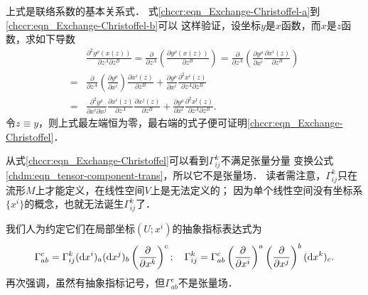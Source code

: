 上式是联络系数的基本关系式．
式\eqref{chccr:eqn_Exchange-Christoffel-a}到\eqref{chccr:eqn_Exchange-Christoffel-b}可以
这样验证，设坐标$y$是$x$函数，而$x$是$z$函数，求如下导数
\begin{equation} \label{chccr:eqn_tmp21}
\begin{aligned}
    &\frac{{{\partial ^2}{y^\rho }\left( {x\left( z \right)} \right)}}{{\partial {z^A}\partial {z^B}}}
     = \frac{\partial }{{\partial {z^A}}}\left( {\frac{{\partial {y^\rho }
                \left( {x\left( z \right)} \right)}}{{\partial {z^B}}}} \right)
             = \frac{\partial }{{\partial {z^A}}}\left( {\frac{{\partial {y^\rho }}}
                 {{\partial {x^i}}}\frac{{\partial {x^i}\left( z \right)}}{{\partial {z^B}}}} \right)\\
    =& \frac{\partial }{{\partial {z^A}}}\left( {\frac{{\partial {y^\rho }}}
        {{\partial {x^i}}}} \right)\frac{{\partial {x^i}\left( z \right)}}{{\partial {z^B}}}
    + \frac{{\partial {y^\rho }}}{{\partial {x^i}}}\frac{{{\partial ^2}{x^i}
            \left( z \right)}}{{\partial {z^A}\partial {z^B}}} \\
    =& \frac{{{\partial ^2}{y^\rho }}}{{\partial {x^i}\partial {x^j}}}
    \frac{{\partial {x^i}\left( z \right)}}{{\partial {z^A}}}
    \frac{{\partial {x^j}\left( z \right)}}{{\partial {z^B}}}
     + \frac{{\partial {y^\rho }}}{{\partial {x^l}}}\frac{{{\partial ^2}{x^l}
             \left( z \right)}}{{\partial {z^A}\partial {z^B}}} .
\end{aligned}\end{equation}
令$z\equiv y$，则上式最左端恒为零，最右端的式子便可证明\eqref{chccr:eqn_Exchange-Christoffel}．

从式\eqref{chccr:eqn_Exchange-Christoffel}可以看到$\Gamma^{k}_{ij}$不满足张量分量
变换公式\eqref{chdm:eqn_tensor-component-trans}，所以它不是张量场．
读者需注意，$\Gamma^{k}_{ij}$只在流形$M$上才能定义，在线性空间$V$上是无法定义的；
因为单个线性空间没有坐标系$\{x^i\}$的概念，也就无法诞生$\Gamma^{k}_{ij}$了．

我们人为约定它们在局部坐标$(U;x^i)$的抽象指标表达式为
\begin{equation}\label{chccr:eqn_Christoffel-naturalbases-ij}
    \Gamma_{ab}^c = \Gamma_{ij}^k ({\rm d}x^i)_a ({\rm d}x^j)_b
    \left(\frac{\partial}{\partial x^k} \right)^c; \quad
    \Gamma_{ij}^k  = \Gamma_{ab}^c  \left(\frac{\partial}{\partial x^i} \right)^a
    \left(\frac{\partial}{\partial x^j} \right)^b ({\rm d}x^k)_c .
\end{equation}
再次强调，虽然有抽象指标记号，但$\Gamma_{ab}^c$不是张量场．


